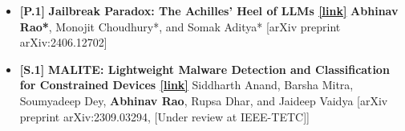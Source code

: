 \documentclass[11pt,letterpaper]{article}
\begin{document}
\begin{itemize}[leftmargin=*,label={},itemsep=4pt]
           
        \item {\color{maincolor}\textbf{[P.1]}} \textbf{Jailbreak Paradox: The Achilles' Heel of LLMs \href{https://arxiv.org/abs/2406.12702}{[link]}}  \textbf{Abhinav Rao*}, Monojit Choudhury*, and Somak Aditya*
            [arXiv preprint arXiv:2406.12702]
        
           
        \item {\color{maincolor}\textbf{[S.1]}} \textbf{MALITE: Lightweight Malware Detection and Classification
                for Constrained Devices \href{https://arxiv.org/abs/2309.03294}{[link]}}  Siddharth Anand, Barsha Mitra, Soumyadeep Dey, \textbf{Abhinav Rao}, Rupsa Dhar, and Jaideep Vaidya
            [arXiv preprint arXiv:2309.03294, [Under review at IEEE-TETC]]
        
           
    \end{itemize}
    
\end{document}
